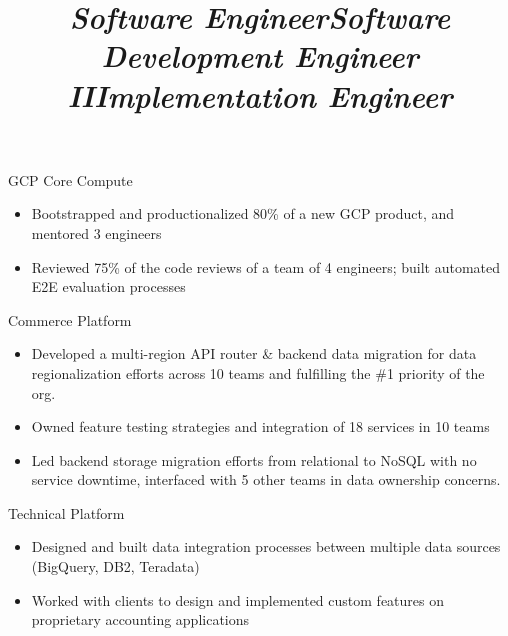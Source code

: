 \documentclass[margin,11pt]{res}
\begin{document}
\begin{resume}
\title{\sl{Software Engineer}}
\begin{position}
GCP Core Compute\\
\begin{itemize}
\item Bootstrapped and productionalized 80\% of a new GCP product, and mentored 3 engineers
\item Reviewed 75\% of the code reviews of a team of 4 engineers; built automated E2E evaluation processes 
\end{itemize}
\end{position}

\title{\sl{Software Development Engineer II}}
\begin{position}
Commerce Platform\\
\begin{itemize}
\item Developed a multi-region API router \&  backend data migration for data regionalization efforts across 10 teams and fulfilling the \#1 priority of the org.
\item Owned feature testing strategies and integration of 18 services in 10 teams
\item Led backend storage migration efforts from relational to NoSQL with no service downtime, interfaced with 5 other teams in data ownership concerns.
\end{itemize}
\end{position}

\title{\sl{Implementation Engineer}}
\begin{position}
Technical Platform\\
\begin{itemize}
\item Designed and built data integration processes between multiple data sources (BigQuery, DB2, Teradata)
\item Worked with clients to design and implemented custom features on proprietary accounting applications
\end{itemize}
\end{position}


\end{resume}
\end{document}
